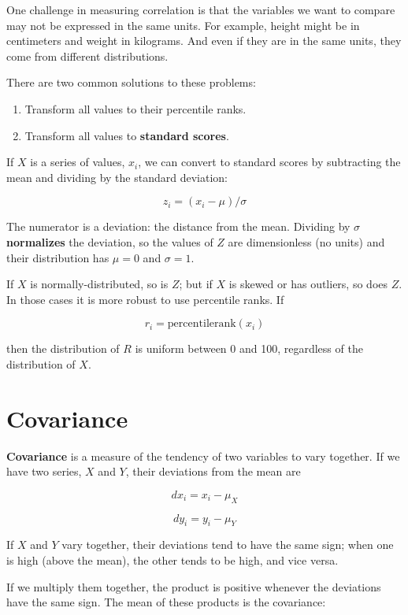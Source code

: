 \documentclass[12pt]{book}
\begin{document}
One challenge in measuring correlation is that the variables we want
to compare may not be expressed in the same units.  For example, height
might be in centimeters and weight in kilograms.  And even if they are
in the same units, they come from different distributions.

There are two common solutions to these problems:

\begin{enumerate}

\item Transform all values to their percentile ranks.

\item Transform all values to {\bf standard scores}.

\end{enumerate}

If $X$ is a series of values, $x_i$, we can convert to standard
scores by subtracting the mean and dividing by the standard deviation:

\[ z_i = (x_i - \mu) / \sigma \]

The numerator is a deviation: the distance from the mean.  Dividing by
$\sigma$ {\bf normalizes} the deviation, so the values of $Z$ are
dimensionless (no units) and their distribution has $\mu=0$ and
$\sigma=1$.

If $X$ is normally-distributed, so is $Z$; but if $X$ is skewed
or has outliers, so does $Z$.  In those cases it is more robust to
use percentile ranks.  If

\[ r_i = \mathrm{percentile rank} (x_i) \]

then the distribution of $R$ is uniform between 0 and 100, regardless of
the distribution of $X$.


\section{Covariance}

{\bf Covariance} is a measure of the tendency of two variables
to vary together.  If we have two series, $X$ and $Y$, their
deviations from the mean are

\[ dx_i = x_i - \mu_X \]

\[ dy_i = y_i - \mu_Y \]

If $X$ and $Y$ vary together, their deviations tend to have the
same sign; when one is high (above the mean), the other tends to be
high, and vice versa.  

If we multiply them together, the product is positive whenever the
deviations have the same sign.  The mean of these products is the
covariance:
\end{document}
